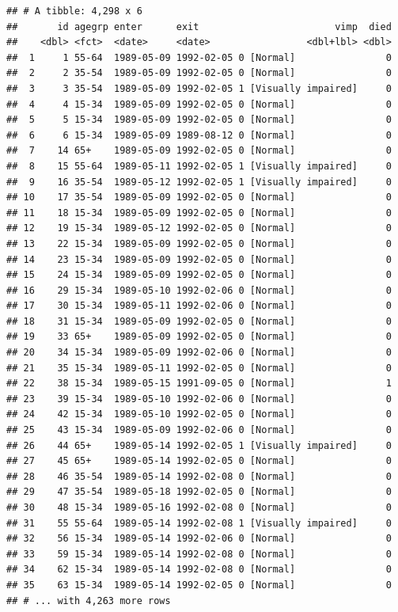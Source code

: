 \documentclass[]{problemset}
\begin{document}
\begin{verbatim}
## # A tibble: 4,298 x 6
##       id agegrp enter      exit                        vimp  died
##    <dbl> <fct>  <date>     <date>                 <dbl+lbl> <dbl>
##  1     1 55-64  1989-05-09 1992-02-05 0 [Normal]                0
##  2     2 35-54  1989-05-09 1992-02-05 0 [Normal]                0
##  3     3 35-54  1989-05-09 1992-02-05 1 [Visually impaired]     0
##  4     4 15-34  1989-05-09 1992-02-05 0 [Normal]                0
##  5     5 15-34  1989-05-09 1992-02-05 0 [Normal]                0
##  6     6 15-34  1989-05-09 1989-08-12 0 [Normal]                0
##  7    14 65+    1989-05-09 1992-02-05 0 [Normal]                0
##  8    15 55-64  1989-05-11 1992-02-05 1 [Visually impaired]     0
##  9    16 35-54  1989-05-12 1992-02-05 1 [Visually impaired]     0
## 10    17 35-54  1989-05-09 1992-02-05 0 [Normal]                0
## 11    18 15-34  1989-05-09 1992-02-05 0 [Normal]                0
## 12    19 15-34  1989-05-12 1992-02-05 0 [Normal]                0
## 13    22 15-34  1989-05-09 1992-02-05 0 [Normal]                0
## 14    23 15-34  1989-05-09 1992-02-05 0 [Normal]                0
## 15    24 15-34  1989-05-09 1992-02-05 0 [Normal]                0
## 16    29 15-34  1989-05-10 1992-02-06 0 [Normal]                0
## 17    30 15-34  1989-05-11 1992-02-06 0 [Normal]                0
## 18    31 15-34  1989-05-09 1992-02-05 0 [Normal]                0
## 19    33 65+    1989-05-09 1992-02-05 0 [Normal]                0
## 20    34 15-34  1989-05-09 1992-02-06 0 [Normal]                0
## 21    35 15-34  1989-05-11 1992-02-05 0 [Normal]                0
## 22    38 15-34  1989-05-15 1991-09-05 0 [Normal]                1
## 23    39 15-34  1989-05-10 1992-02-06 0 [Normal]                0
## 24    42 15-34  1989-05-10 1992-02-05 0 [Normal]                0
## 25    43 15-34  1989-05-09 1992-02-06 0 [Normal]                0
## 26    44 65+    1989-05-14 1992-02-05 1 [Visually impaired]     0
## 27    45 65+    1989-05-14 1992-02-05 0 [Normal]                0
## 28    46 35-54  1989-05-14 1992-02-08 0 [Normal]                0
## 29    47 35-54  1989-05-18 1992-02-05 0 [Normal]                0
## 30    48 15-34  1989-05-16 1992-02-08 0 [Normal]                0
## 31    55 55-64  1989-05-14 1992-02-08 1 [Visually impaired]     0
## 32    56 15-34  1989-05-14 1992-02-06 0 [Normal]                0
## 33    59 15-34  1989-05-14 1992-02-08 0 [Normal]                0
## 34    62 15-34  1989-05-14 1992-02-08 0 [Normal]                0
## 35    63 15-34  1989-05-14 1992-02-05 0 [Normal]                0
## # ... with 4,263 more rows
\end{verbatim}
\end{document}
